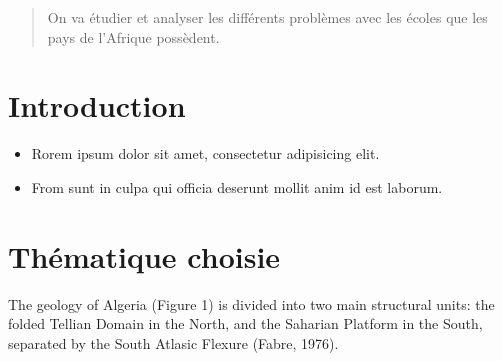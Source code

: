 \documentclass[a0, portrait]{a0poster}
\begin{document}

\begin{multicols}{3} %


\color{Navy} %

\begin{abstract}
On va étudier et analyser les différents problèmes avec les écoles que les pays de l'Afrique possèdent.
\end{abstract}

\color{Black} %
\section*{Introduction}

\begin{itemize}
\item Rorem ipsum dolor sit amet, consectetur adipisicing elit.

\item From sunt in culpa qui officia deserunt mollit anim id est laborum.
\end{itemize}

\color{Black} %

\section*{Thématique choisie}
The geology of Algeria (Figure 1) is divided into two main structural units: the folded Tellian Domain in the North, and the Saharian Platform in the South, separated by the South Atlasic Flexure (Fabre, 1976).
\begin{center}\vspace{1cm}
\end{center}%

\end{multicols}
\end{document}
